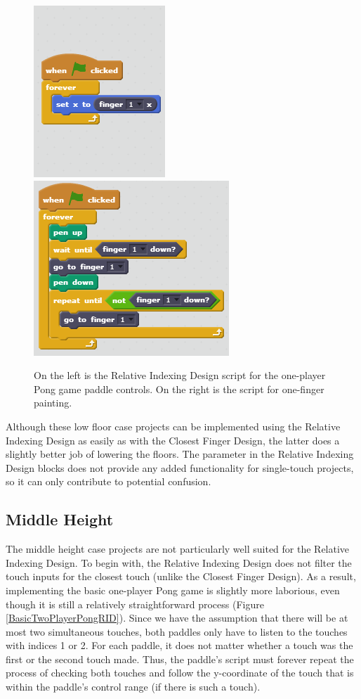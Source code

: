 \begin{figure}
\centering
\includegraphics{images/OnePlayerPongRID.PNG}
\includegraphics{images/OneFingerPaintingRID.PNG}
\caption[Sample Relative Indexing Design Scripts for Low Floor Case Projects]{On the left is the Relative Indexing Design script for the one-player Pong game paddle controls.  On the right is the script for one-finger painting.}
\label{LowFloorRID}
\end{figure}

Although  these low floor case projects can be implemented using the Relative Indexing Design as easily as with the Closest Finger Design, the latter does a slightly better job of lowering the floors. The parameter in the Relative Indexing Design blocks does not provide any added functionality for single-touch projects, so it can only contribute to potential confusion.

\subsection{Middle Height}

The middle height case projects are not particularly well suited for the Relative Indexing Design. To begin with, the Relative Indexing Design does not filter the touch inputs for the closest touch (unlike the Closest Finger Design). As a result, implementing the basic one-player Pong game is slightly more laborious, even though it is still a relatively straightforward process (Figure \ref{BasicTwoPlayerPongRID}). Since we have the assumption that there will be at most two simultaneous touches, both paddles only have to listen to the touches with indices 1 or 2. For each paddle, it does not matter whether a touch was the first or the second touch made. Thus, the paddle's script must forever repeat the process of checking both touches and follow the y-coordinate of the touch that is within the paddle's control range (if there is such a touch).

